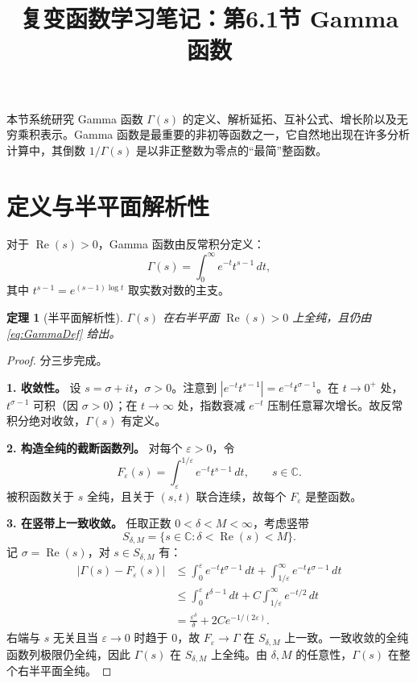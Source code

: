 \documentclass[UTF8]{ctexart}
\title{复变函数学习笔记：第6.1节 Gamma 函数}
\author{}
\date{}
\newtheorem{theorem}{定理}[section]
\numberwithin{equation}{section}
\newcommand{\CC}{\mathbb{C}}
\begin{document}
\maketitle

本节系统研究 Gamma 函数 \(\Gamma(s)\) 的定义、解析延拓、互补公式、增长阶以及无穷乘积表示。Gamma 函数是最重要的非初等函数之一，它自然地出现在许多分析计算中，其倒数 \(1/\Gamma(s)\) 是以非正整数为零点的“最简”整函数。

\section{定义与半平面解析性}

对于 \(\operatorname{Re}(s)>0\)，Gamma 函数由反常积分定义：
\begin{equation}\label{eq:GammaDef}
\Gamma(s) = \int_{0}^{\infty} e^{-t} t^{s-1}\, dt,
\end{equation}
其中 \(t^{s-1}=e^{(s-1)\log t}\) 取实数对数的主支。

\begin{theorem}[半平面解析性]\label{thm:GammaHalfPlane}
\(\Gamma(s)\) 在右半平面 \(\operatorname{Re}(s)>0\) 上全纯，且仍由 \eqref{eq:GammaDef} 给出。
\end{theorem}

\begin{proof}
分三步完成。

\textbf{1. 收敛性。} 设 \(s=\sigma+it\)，\(\sigma>0\)。注意到 \(|e^{-t}t^{s-1}|=e^{-t}t^{\sigma-1}\)。在 \(t\to0^{+}\) 处，\(t^{\sigma-1}\) 可积（因 \(\sigma>0\)）；在 \(t\to\infty\) 处，指数衰减 \(e^{-t}\) 压制任意幂次增长。故反常积分绝对收敛，\(\Gamma(s)\) 有定义。

\textbf{2. 构造全纯的截断函数列。} 对每个 \(\varepsilon>0\)，令
\[
F_{\varepsilon}(s)=\int_{\varepsilon}^{1/\varepsilon} e^{-t} t^{s-1}\, dt,\qquad s\in\CC.
\]
被积函数关于 \(s\) 全纯，且关于 \((s,t)\) 联合连续，故每个 \(F_{\varepsilon}\) 是整函数。

\textbf{3. 在竖带上一致收敛。} 任取正数 \(0<\delta<M<\infty\)，考虑竖带
\[
S_{\delta,M}=\{s\in\CC:\delta<\operatorname{Re}(s)<M\}.
\]
记 \(\sigma=\operatorname{Re}(s)\)，对 \(s\in S_{\delta,M}\) 有：
\[
\begin{aligned}
|\Gamma(s)-F_{\varepsilon}(s)|
&\le \int_{0}^{\varepsilon} e^{-t}t^{\sigma-1}\, dt + \int_{1/\varepsilon}^{\infty} e^{-t}t^{\sigma-1}\, dt\\
&\le \int_{0}^{\varepsilon} t^{\delta-1}\, dt + C\int_{1/\varepsilon}^{\infty} e^{-t/2}\, dt\\
&= \frac{\varepsilon^{\delta}}{\delta} + 2C e^{-1/(2\varepsilon)}.
\end{aligned}
\]
右端与 \(s\) 无关且当 \(\varepsilon\to0\) 时趋于 0，故 \(F_{\varepsilon}\to\Gamma\) 在 \(S_{\delta,M}\) 上一致。一致收敛的全纯函数列极限仍全纯，因此 \(\Gamma(s)\) 在 \(S_{\delta,M}\) 上全纯。由 \(\delta,M\) 的任意性，\(\Gamma(s)\) 在整个右半平面全纯。
\end{proof}
\end{document}
